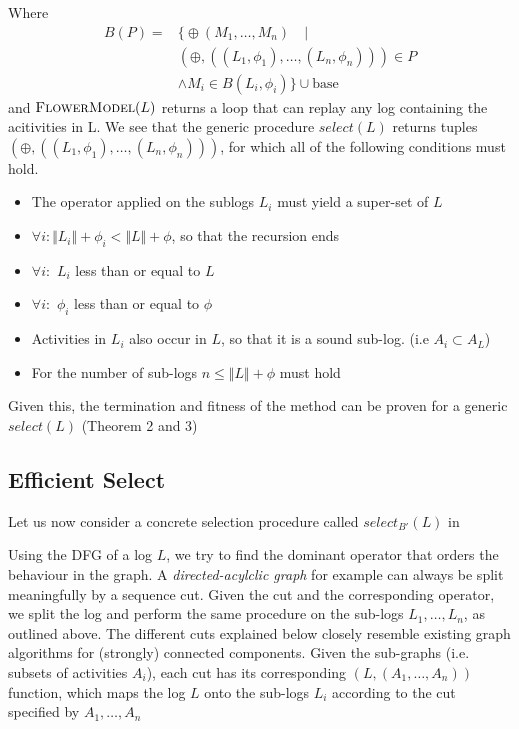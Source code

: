 \documentclass[a4paper]{IEEEtran}
\begin{document}
Where
\begin{align*}
B(P) = & \Big\{ \oplus (M_1, \dots ,M_n) \quad | \\ &(\oplus, ((L_1, \phi_1), \dots, (L_n, \phi_n))) \in P \\ &\wedge M_i \in B(L_i, \phi_i) \Big\} \cup \text{base}
\end{align*}
and $\textproc{FlowerModel}(L)$ returns a loop that can replay any log containing the acitivities in L.
We see that the generic procedure $select(L)$ returns tuples $(\oplus, ((L_1, \phi_1), \dots, (L_n, \phi_n)))$, for which all of the following conditions must hold.
\begin{itemize}
    \item The operator applied on the sublogs $L_i$ must yield a super-set of $L$
    \item $\forall i : \Vert L_i \Vert + \phi_i < \Vert L \Vert + \phi $, so that the recursion ends
    \item $\forall i :$ $L_i$ less than or equal to $L$
    \item $\forall i :$ $\phi_i$ less than or equal to $\phi$
    \item Activities in $L_i$ also occur in $L$, so that it is a sound sub-log. (i.e $A_i \subset A_L$)
    \item For the number of sub-logs $n \leq \Vert L \Vert + \phi$ must hold
\label{list:properties}
\end{itemize}
Given this, the termination and fitness of the method can be proven for a generic $select(L)$ \cite{inductivemining-constructive} (Theorem 2 and 3)

\subsection{Efficient Select} %
\label{ssub:efficientselect}
Let us now consider a concrete selection procedure called $select_{B'}(L)$ in \cite{inductivemining-constructive}

Using the DFG of a log $L$, we try to find the dominant operator that orders the behaviour in the graph. A \textit{directed-acylclic graph} for example can always be split meaningfully by a sequence cut. Given the cut and the corresponding operator, we split the log and perform the same procedure on the sub-logs $L_1, \dots, L_n$, as outlined above. The different cuts explained below closely resemble existing graph algorithms for (strongly) connected components. Given the sub-graphs (i.e. subsets of activities $A_i$), each cut has its corresponding $(L, (A_1, \dots, A_n))$ function, which maps the log $L$ onto the sub-logs $L_i$ according to the cut specified by $A_1, \dots, A_n$
\end{document}

